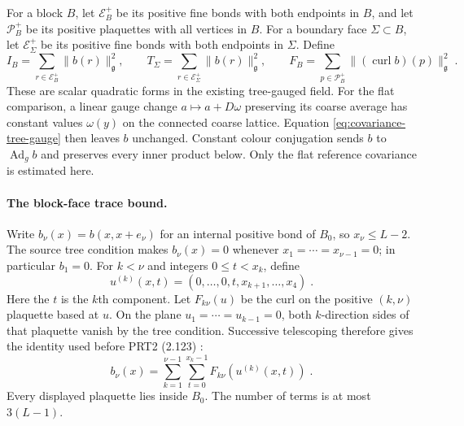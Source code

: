 \documentclass[11pt]{article}
\begin{document}
For a block $B$, let $\mathcal E_B^+$ be its positive fine bonds with both endpoints in $B$, and let $\mathcal P_B^+$ be its positive plaquettes with all vertices in $B$. For a boundary face $\Sigma\subset B$, let $\mathcal E_\Sigma^+$ be its positive fine bonds with both endpoints in $\Sigma$. Define
\begin{equation}\label{eq:direct-block-face-energies}
    I_B=\sum_{r\in \mathcal E_B^+}\|b(r)\|_{\mathfrak g}^2,
    \qquad
    T_\Sigma=\sum_{r\in \mathcal E_\Sigma^+}\|b(r)\|_{\mathfrak g}^2,
    \qquad
    F_B=\sum_{p\in \mathcal P_B^+}
        \|(\operatorname{curl}b)(p)\|_{\mathfrak g}^2\;.
\end{equation}
These are scalar quadratic forms in the existing tree-gauged field. For the flat comparison, a linear gauge change $a\mapsto a+D\omega$ preserving its coarse average has constant values $\omega(y)$ on the connected coarse lattice. Equation \eqref{eq:covariance-tree-gauge} then leaves $b$ unchanged. Constant colour conjugation sends $b$ to $\operatorname{Ad}_g b$ and preserves every inner product below. Only the flat reference covariance is estimated here.

\paragraph{The block-face trace bound.}
Write $b_\nu(x)=b(x,x+e_\nu)$ for an internal positive bond of $B_0$, so $x_\nu\leq L-2$. The source tree condition makes $b_\nu(x)=0$ whenever $x_1=\cdots=x_{\nu-1}=0$; in particular $b_1=0$. For $k<\nu$ and integers $0\leq t<x_k$, define
\begin{equation}\label{eq:direct-telescoping-point}
    u^{(k)}(x,t)=(0,\ldots,0,t,x_{k+1},\ldots,x_4)\;.
\end{equation}
Here the $t$ is the $k$th component. Let $F_{k\nu}(u)$ be the curl on the positive $(k,\nu)$ plaquette based at $u$. On the plane $u_1=\cdots=u_{k-1}=0$, both $k$-direction sides of that plaquette vanish by the tree condition. Successive telescoping therefore gives the identity used before PRT2 (2.123) \cite{BalabanPRT2}:
\begin{equation}\label{eq:direct-tree-telescoping}
    b_\nu(x)=
        \sum_{k=1}^{\nu-1}\sum_{t=0}^{x_k-1}
            F_{k\nu}(u^{(k)}(x,t))\;.
\end{equation}
Every displayed plaquette lies inside $B_0$. The number of terms is at most $3(L-1)$.
\end{document}

